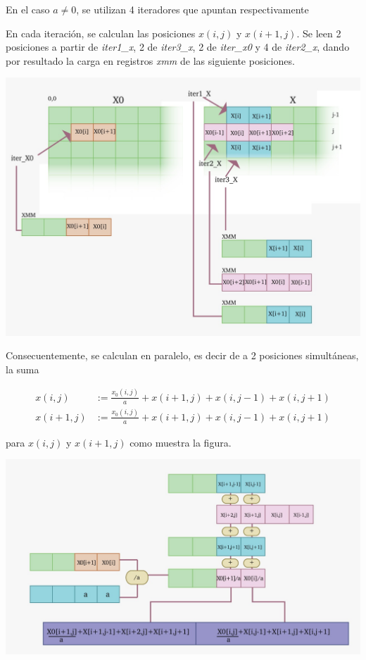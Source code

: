 En el caso $a \neq 0$, se utilizan 4 iteradores que apuntan respectivamente




En cada iteración, se calculan las posiciones $x(i,j)$ y $x(i+1,j)$.
Se leen 2 posiciones a partir de {\it iter1_x\/}, 2 de {\it iter3_x\/}, 2 de
{\it iter_x0\/} y 4 de {\it iter2_x\/}, dando por resultado la carga en
registros {\it xmm\/} de las siguiente posiciones.

\includegraphics[width=\textwidth]{imagenes/liniter.jpeg}


Consecuentemente, se calculan en paralelo, es decir de a 2 posiciones
simultáneas, la suma

{
\setlength{\abovedisplayskip}{-5pt}
\setlength{\belowdisplayskip}{-5pt}
\begin{align*}
x(i,j) &:= \frac{x_0(i,j)}{a} + x(i+1,j) + x(i,j-1) + x(i,j+1)\\
x(i+1,j) &:= \frac{x_0(i,j)}{a} + x(i+1,j) + x(i,j-1) + x(i,j+1)
\end{align*}
}


para $x(i,j)$ y $x(i+1,j)$ como muestra la figura.

\includegraphics[width=\textwidth]{imagenes/lina11.jpeg}


